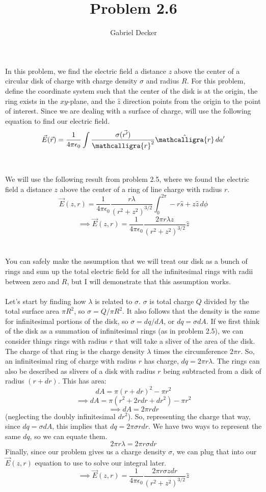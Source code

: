 \documentclass[12pt]{article}
\title{Problem 2.6}
\author{Gabriel Decker}
\newcommand{\scripty}[1]{\ensuremath{\mathcalligra{#1}}}
\begin{document}
\maketitle
\begin{flushleft}


In this problem, we find the electric field a distance $z$ above the center of a circular disk of charge with charge density $\sigma$ and radius $R$.
For this problem, define the coordinate system such that the center of the disk is at the origin, the ring exists in the $xy$-plane, and the $\hat{z}$ direction points from the origin to the point of interest.
Since we are dealing with a surface of charge, will use the following equation to find our electric field.
$$\vec{E}(\vec{r})=\frac{1}{4\pi\epsilon_0}\int\frac{\sigma(\vec{r'})}{\scripty{r}^2}\hat{\scripty{r}}\,da'$$\\~\\

We will use the following result from problem 2.5, where we found the electric field a distance $z$ above the center of a ring of line charge with radius $r$.
$$\vec{E}(z,r)=\frac{1}{4\pi\epsilon_0}\frac{r\lambda}{(r^2+z^2)^{3/2}}\int_0^{2\pi}-r\hat{s}+z\hat{z}\,d\phi$$
$$\implies\vec{E}(z,r)=\frac{1}{4\pi\epsilon_0}\frac{2\pi r\lambda z}{(r^2+z^2)^{3/2}}\hat{z}$$\\~\\

You can safely make the assumption that we will treat our disk as a bunch of rings and sum up the total electric field for all the infinitesimal rings with radii between zero and $R$, but I will demonstrate that this assumption works.\\~\\

Let's start by finding how $\lambda$ is related to $\sigma$.
$\sigma$ is total charge $Q$ divided by the total surface area $\pi R^2$, so $\sigma=Q/\pi R^2$.
It also follows that the density is the same for infinitesimal portions of the disk, so $\sigma=dq/dA$, or $dq=\sigma dA$.
If we first think of the disk as a summation of infinitesimal rings (as in problem 2.5), we can consider things rings with radius $r$ that will take a sliver of the area of the disk.
The charge of that ring is the charge density $\lambda$ times the circumference $2\pi r$.
So, an infinitesimal ring of charge with radius $r$ has charge, $dq=2\pi r\lambda$.
The rings can also be described as slivers of a disk with radius $r$ being subtracted from a disk of radius $(r+dr)$.
This has area:
$$dA=\pi(r+dr)^2-\pi r^2$$
$$\implies dA=\pi(r^2+2rdr+dr^2)-\pi r^2$$
$$\implies dA=2\pi rdr$$
(neglecting the doubly infinitesimal $dr^2$).
So, representing the charge that way, since $dq=\sigma dA$, this implies that $dq=2\pi\sigma rdr$.
We have two ways to represent the same $dq$, so we can equate them.
$$2\pi r\lambda=2\pi r\sigma dr$$
Finally, since our problem gives us a charge density $\sigma$, we can plug that into our $\vec{E}(z,r)$ equation to use to solve our integral later.
$$\implies\vec{E}(z,r)=\frac{1}{4\pi\epsilon_0}\frac{2\pi r\sigma zdr}{(r^2+z^2)^{3/2}}\hat{z}$$\\~\\


\end{flushleft}
\end{document}
